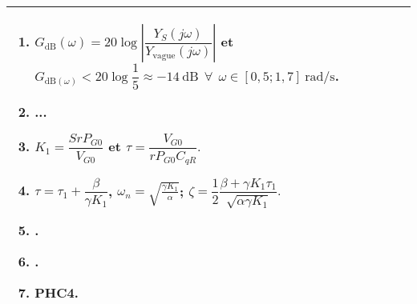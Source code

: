 \begin{multicols}{2}
%
%
%
%
%
%
%
%
%
%
%

\ifprof
\else
\begin{tabular}{|p{.95\linewidth}|}
\hline
\begin{enumerate}
\item  $G_{\text{dB}}(\omega)=20\log \left \vert \dfrac{Y_S(j\omega)}{Y_{\text{vague}}(j\omega)}\right \vert$ et 
$G_{\text{dB}(\omega)}<20 \log \dfrac{1}{5}\approx - 14 \ \text{dB} \ \ \forall \ \ \omega\in[0,5;1,7]  \ \text{rad/s}$.
\item ...
\item $K_1=\dfrac{SrP_{G0}}{V_{G0}}$ et $\tau=\dfrac{V_{G0}}{rP_{G0}C_{qR}}.$
\item $\tau=\tau_1+\dfrac{\beta}{\gamma K_1}$, $\omega_n=\sqrt{\frac{\gamma K_1}{\alpha}}$; $\zeta=\dfrac{1}{2}\dfrac{\beta+\gamma K_1 \tau_1}{\sqrt{\alpha \gamma K_1}}.$
\item .
\item .
\item PHC4.
\end{enumerate}\\
\hline
\end{tabular}
\fi
\ifprof
\else
\end{multicols}
\fi
